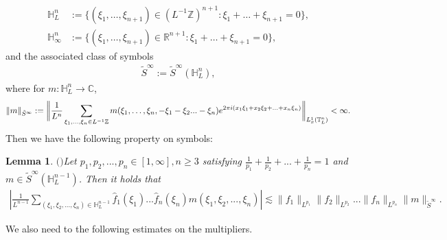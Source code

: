 \documentclass[UTF-8,reqno]{amsart}
\numberwithin{equation}{section}
\newtheorem{lemma}[theorem]{Lemma}
\theoremstyle{definition}
\def\geq{\geqslant}
\def\geq{\geqslant}
\begin{document}
\begin{align*}   
   \mathbb{H}_{L}^n& := \{ (\xi_1, \ldots, \xi_{n+1}) \in (L^{-1}\mathbb{Z})^{n+1} : \xi_1 + \ldots + \xi_{n+1} = 0 \},\\
    \mathbb{H}_{\infty}^n &:= \{ (\xi_1, \ldots, \xi_{n+1}) \in \mathbb{R}^{n+1} : \xi_1 + \ldots + \xi_{n+1} = 0 \},
\end{align*} 
and the associated class of symbols
\begin{align*}
    \tilde S^\infty:=\tilde S^\infty(\mathbb{H}_L^n),
\end{align*}
where for $m:\mathbb{H}_L^n\to\mathbb{C}$,
\begin{equation}
   \| m \|_{\tilde S^\infty} := \bigg{\|}\frac{1}{L^n} \sum_{\xi_1, \ldots, \xi_{n} \in L^{-1} \mathbb{Z}} m(\xi_1, \ldots, \xi_{n},-\xi_1-\xi_2...-\xi_{n}) e^{2\pi i(x_1\xi_1+x_2\xi_2+...+x_n\xi_n)}\bigg{\|}_{L^1_x(\mathbb{T}_L^n)} < \infty.
\end{equation} 
Then we have the following property on  symbols:  \begin{lemma}$($\cite[Lemma 2.1]{DIP25a}$)$\label{lem:holder}
     Let $p_1,p_2,...,p_n\in[1,\infty],n\geq3$ satisfying $\frac1{p_1}+\frac1{p_2}+...+\frac1{p_n}=1$ and $m\in\tilde{S}^\infty(\mathbb{H}_L^{n-1})$. Then it holds that
     \begin{align*}
        \left| \frac{1}{L^{n-1}}\sum_{(\xi_1,\xi_2,...,\xi_n)\in\mathbb{H}_L^{n-1}}\widehat{f}_1(\xi_1)...\widehat{f}_n(\xi_n)m(\xi_1,\xi_2,...,\xi_n)\right|\lesssim \|f_1\|_{L^{p_1}} \|f_2\|_{L^{p_2}}... \|f_n\|_{L^{p_n}}\|m\|_{\tilde{S}^\infty}.
     \end{align*}
 \end{lemma}
We also need to the following estimates on  the  multipliers.  
\end{document}

